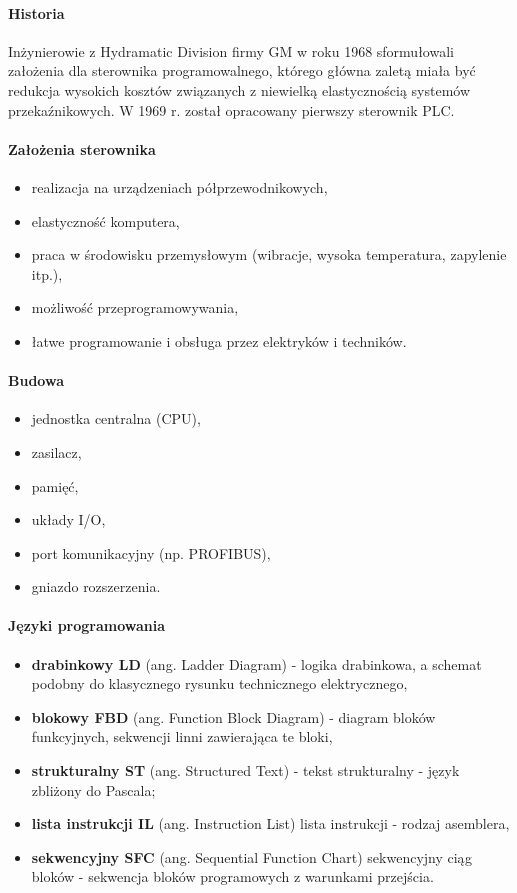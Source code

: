 \documentclass[a4paper,twoside]{report}
\begin{document}
\paragraph{Historia\\}
Inżynierowie z Hydramatic Division firmy GM w roku 1968 sformułowali założenia dla sterownika programowalnego, którego główna zaletą miała być redukcja wysokich kosztów związanych z niewielką elastycznością systemów przekaźnikowych. W 1969 r. został opracowany pierwszy sterownik PLC.

\paragraph{Założenia sterownika}
\begin{itemize}
\item realizacja na urządzeniach półprzewodnikowych,
\item elastyczność komputera,
\item praca w środowisku przemysłowym (wibracje, wysoka temperatura, zapylenie itp.),
\item możliwość przeprogramowywania,
\item łatwe programowanie i obsługa przez elektryków i techników.
\end{itemize}

\paragraph{Budowa}
\begin{itemize}
\item jednostka centralna (CPU),
\item zasilacz,
\item pamięć,
\item układy I/O,
\item port komunikacyjny (np. PROFIBUS),
\item gniazdo rozszerzenia.
\end{itemize}

\paragraph{Języki programowania}
\begin{itemize}
\item \textbf{drabinkowy LD} (ang. Ladder Diagram) - logika drabinkowa, a schemat podobny do klasycznego rysunku technicznego elektrycznego,
\item \textbf{blokowy FBD} (ang. Function Block Diagram) - diagram bloków funkcyjnych, sekwencji linni zawierająca te bloki,
\item \textbf{strukturalny ST} (ang. Structured Text) - tekst strukturalny - język zbliżony do Pascala;
\item \textbf{lista instrukcji IL} (ang. Instruction List) lista instrukcji - rodzaj asemblera,
\item \textbf{sekwencyjny SFC} (ang. Sequential Function Chart) sekwencyjny ciąg bloków - sekwencja bloków programowych z warunkami przejścia.
\end{itemize}
\end{document}

